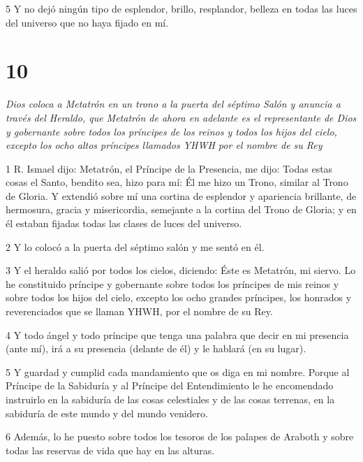 \par 5 Y no dejó ningún tipo de esplendor, brillo, resplandor, belleza en todas las luces del universo que no haya fijado en mí.

\chapter{10}

\par \textit{Dios coloca a Metatrón en un trono a la puerta del séptimo Salón y anuncia a través del Heraldo, que Metatrón de ahora en adelante es el representante de Dios y gobernante sobre todos los príncipes de los reinos y todos los hijos del cielo, excepto los ocho altos príncipes llamados YHWH por el nombre de su Rey}

\par 1 R. Ismael dijo: Metatrón, el Príncipe de la Presencia, me dijo: Todas estas cosas el Santo, bendito sea, hizo para mí: Él me hizo un Trono, similar al Trono de Gloria. Y extendió sobre mí una cortina de esplendor y apariencia brillante, de hermosura, gracia y misericordia, semejante a la cortina del Trono de Gloria; y en él estaban fijadas todas las clases de luces del universo.

\par 2 Y lo colocó a la puerta del séptimo salón y me sentó en él.

\par 3 Y el heraldo salió por todos los cielos, diciendo: Éste es Metatrón, mi siervo. Lo he constituido príncipe y gobernante sobre todos los príncipes de mis reinos y sobre todos los hijos del cielo, excepto los ocho grandes príncipes, los honrados y reverenciados que se llaman YHWH, por el nombre de su Rey.

\par 4 Y todo ángel y todo príncipe que tenga una palabra que decir en mi presencia (ante mí), irá a su presencia (delante de él) y le hablará (en su lugar).

\par 5 Y guardad y cumplid cada mandamiento que os diga en mi nombre. Porque al Príncipe de la Sabiduría y al Príncipe del Entendimiento le he encomendado instruirlo en la sabiduría de las cosas celestiales y de las cosas terrenas, en la sabiduría de este mundo y del mundo venidero.

\par 6 Además, lo he puesto sobre todos los tesoros de los palapes de Araboth y sobre todas las reservas de vida que hay en las alturas.

